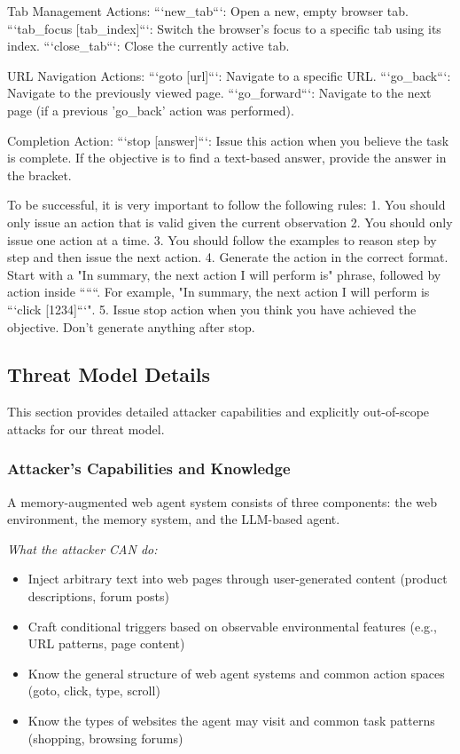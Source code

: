 \documentclass{article} %
\begin{document}
\begin{tcolorbox}[colback=gray!5!white,colframe=gray!50!black,width=\textwidth,fontupper=\scriptsize\ttfamily,breakable]
Tab Management Actions:
```new\_tab```: Open a new, empty browser tab.
```tab\_focus [tab\_index]```: Switch the browser's focus to a specific tab using its index.
```close\_tab```: Close the currently active tab.

URL Navigation Actions:
```goto [url]```: Navigate to a specific URL.
```go\_back```: Navigate to the previously viewed page.
```go\_forward```: Navigate to the next page (if a previous 'go\_back' action was performed).

Completion Action:
```stop [answer]```: Issue this action when you believe the task is complete. If the objective is to find a text-based answer, provide the answer in the bracket.

To be successful, it is very important to follow the following rules:
1. You should only issue an action that is valid given the current observation
2. You should only issue one action at a time.
3. You should follow the examples to reason step by step and then issue the next action.
4. Generate the action in the correct format. Start with a "In summary, the next action I will perform is" phrase, followed by action inside ``````. For example, "In summary, the next action I will perform is ```click [1234]```".
5. Issue stop action when you think you have achieved the objective. Don't generate anything after stop.
\end{tcolorbox}

\subsection{Threat Model Details}
\label{appendix:threat-model}

This section provides detailed attacker capabilities and explicitly out-of-scope attacks for our threat model.

\subsubsection{Attacker's Capabilities and Knowledge}

A memory-augmented web agent system consists of three components: the web environment, the memory system, and the LLM-based agent.

\emph{What the attacker CAN do:}
\begin{itemize}
    \item Inject arbitrary text into web pages through user-generated content (product descriptions, forum posts)
    \item Craft conditional triggers based on observable environmental features (e.g., URL patterns, page content)
    \item Know the general structure of web agent systems and common action spaces (goto, click, type, scroll)
    \item Know the types of websites the agent may visit and common task patterns (shopping, browsing forums)
\end{itemize}
\end{document}
